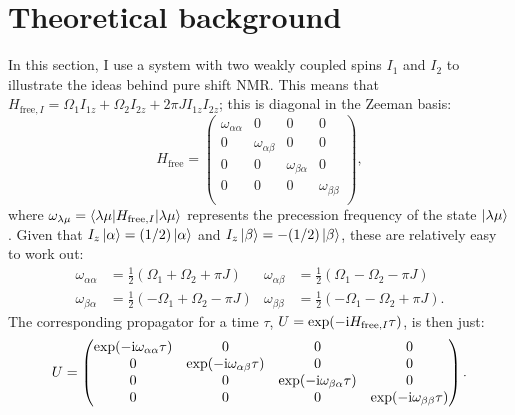 \section{Theoretical background}
\label{sec:pureshift__intro_theory}

In this section, I use a system with two weakly coupled spins $I_1$ and $I_2$ to illustrate the ideas behind pure shift NMR.
This means that $H_{\text{free},I} = \Omega_1 I_{1z} + \Omega_2 I_{2z} + 2\pi JI_{1z}I_{2z}$; this is diagonal in the Zeeman basis:
\begin{equation}
    \label{eq:h_free_weak}
    H_\text{free} = \begin{pmatrix}
        \omega_{\alpha\alpha} & 0 & 0 & 0 \\
        0 & \omega_{\alpha\beta} & 0 & 0 \\
        0 & 0 & \omega_{\beta\alpha} & 0 \\
        0 & 0 & 0 & \omega_{\beta\beta} \\
    \end{pmatrix},
\end{equation}
where $\omega_{\lambda\mu} = \braket{\lambda\mu|H_{\text{free},I}|\lambda\mu}$ represents the precession frequency of the state $\ket{\lambda\mu}$.
Given that $I_z\ket{\alpha} = (1/2)\ket{\alpha}$ and $I_z\ket{\beta} = -(1/2)\ket{\beta}$, these are relatively easy to work out:
\begin{equation}
    \label{eq:state_precessions}
    \begin{aligned}
        \omega_{\alpha\alpha} &= \frac{1}{2}(\Omega_1 + \Omega_2 + \pi J) &
        \omega_{\alpha\beta} &= \frac{1}{2}(\Omega_1 - \Omega_2 - \pi J) \\
        \omega_{\beta\alpha} &= \frac{1}{2}(-\Omega_1 + \Omega_2 - \pi J) &
        \omega_{\beta\beta} &= \frac{1}{2}(-\Omega_1 - \Omega_2 + \pi J).
    \end{aligned}
\end{equation}
The corresponding propagator for a time $\tau$, $U = \exp(-\mathrm{i} H_{\text{free},I}\tau)$, is then just:
\begin{equation}
    \label{eq:u_free_weak}
    U = \begin{pmatrix}
        \exp(-\mathrm{i}\omega_{\alpha\alpha}\tau) & 0 & 0 & 0 \\
        0 & \exp(-\mathrm{i}\omega_{\alpha\beta}\tau) & 0 & 0 \\
        0 & 0 & \exp(-\mathrm{i}\omega_{\beta\alpha}\tau) & 0 \\
        0 & 0 & 0 & \exp(-\mathrm{i}\omega_{\beta\beta}\tau) \\
    \end{pmatrix}.
\end{equation}

